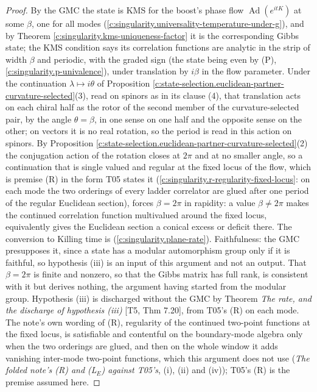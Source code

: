 \documentclass[11pt]{article}
\theoremstyle{definition}
\theoremstyle{plain}
\begin{document}
\begin{proof}
By the GMC the state is KMS for the boost's phase flow $\operatorname{Ad}(e^{itK})$ at some $\beta$, one for all modes (\ref{c:singularity.universality-temperature-under-g}), and by Theorem \ref{c:singularity.kms-uniqueness-factor} it is the corresponding Gibbs state; the KMS condition says its correlation functions are analytic in the strip of width $\beta$ and periodic, with the graded sign (the state being even by (P), \ref{c:singularity.p-univalence}), under translation by $i\beta$ in the flow parameter. Under the continuation $\lambda \mapsto i\theta$ of Proposition \ref{c:state-selection.euclidean-partner-curvature-selected}(3), read on spinors as in its clause (4), that translation acts on each chiral half as the rotor of the second member of the curvature-selected pair, by the angle $\theta = \beta$, in one sense on one half and the opposite sense on the other; on vectors it is no real rotation, so the period is read in this action on spinors. By Proposition \ref{c:state-selection.euclidean-partner-curvature-selected}(2) the conjugation action of the rotation closes at $2\pi$ and at no smaller angle, so a continuation that is single valued and regular at the fixed locus of the flow, which is premise (R) in the form T05 states it (\ref{c:singularity.r-regularity-fixed-locus}: on each mode the two orderings of every ladder correlator are glued after one period of the regular Euclidean section), forces $\beta = 2\pi$ in rapidity: a value $\beta \neq 2\pi$ makes the continued correlation function multivalued around the fixed locus, equivalently gives the Euclidean section a conical excess or deficit there. The conversion to Killing time is \cite[Prop.~6.2]{ButlerT5} (\ref{c:singularity.plane-rate}). Faithfulness: the GMC presupposes it, since a state has a modular automorphism group only if it is faithful, so hypothesis (iii) is an input of this argument and not an output. That $\beta = 2\pi$ is finite and nonzero, so that the Gibbs matrix has full rank, is consistent with it but derives nothing, the argument having started from the modular group. Hypothesis (iii) is discharged without the GMC by Theorem \emph{The rate, and the discharge of hypothesis (iii)} [T5, Thm 7.20], from T05's (R) on each mode. The note's own wording of (R), regularity of the continued two-point functions at the fixed locus, is satisfiable and contentful on the boundary-mode algebra only when the two orderings are glued, and then on the whole window it adds vanishing inter-mode two-point functions, which this argument does not use (\emph{The folded note's (R) and (L$_E$) against T05's}, (i), (ii) and (iv)); T05's (R) is the premise assumed here.

\end{proof}
\end{document}
